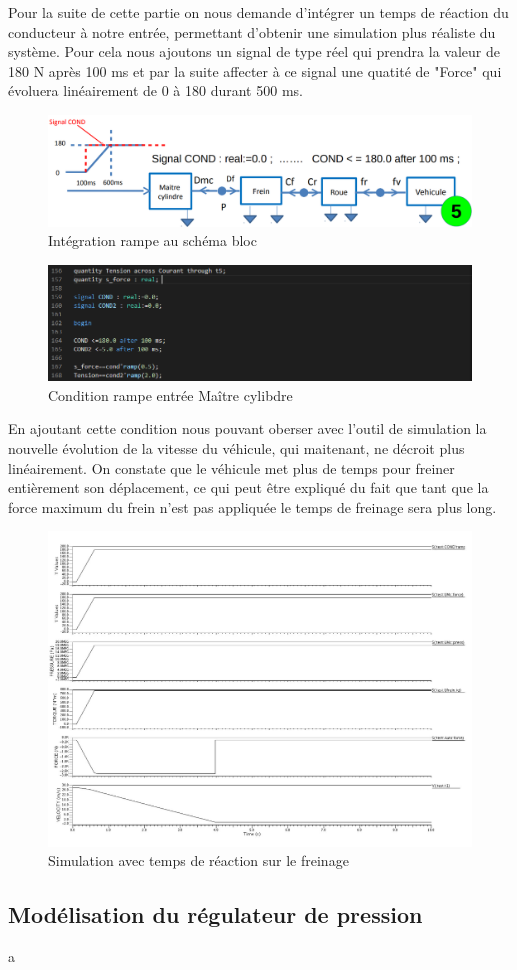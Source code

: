 Pour la suite de cette partie on nous demande d'intégrer un temps de réaction du conducteur à notre entrée, permettant d'obtenir une simulation plus réaliste du système. Pour cela nous ajoutons un signal de type réel qui prendra la valeur de 180 N après 100 ms et par la suite affecter à ce signal une quatité de "Force" qui évoluera linéairement de 0 à 180 durant 500 ms.
\begin{figure}[h]
    \centering
    \includegraphics[width=\textwidth]{images/cinq.png}
    \caption{Intégration rampe au schéma bloc}
\end{figure}


\newpage
\begin{figure}[h]
    \centering
    \includegraphics[width=\textwidth]{images/cond.png}
    \caption{Condition rampe entrée Maître cylibdre}
\end{figure}

En ajoutant cette condition nous pouvant oberser avec l'outil de simulation la nouvelle évolution de la vitesse du véhicule, qui maitenant, ne décroit plus linéairement. On constate que le véhicule met plus de temps pour freiner entièrement son déplacement, ce qui peut être expliqué du fait que tant que la force maximum du frein n'est pas appliquée le temps de freinage sera plus long.

\begin{figure}[h]
    \centering
    \includegraphics[width=\textwidth]{images/Instanciation_vehicule_roue_frein_Mc_rampe.jpg}
    \caption{Simulation avec temps de réaction sur le freinage}
\end{figure}

\newpage
\subsection{Modélisation du régulateur de pression}
a
\newpage